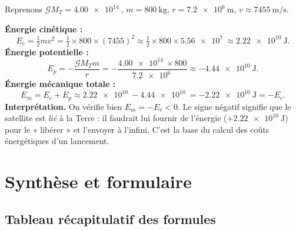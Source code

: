 \documentclass[11pt,a4paper]{article}
\newcommand{\Grav}{\mathcal{G}}        %
\begin{document}
\begin{exemple}
Reprenons $\Grav M_T=\SI{4.00e14}{}$, $m=\SI{800}{\kilogram}$, $r=\SI{7.2e6}{\metre}$,
$v\approx\SI{7455}{\metre\per\second}$.

\smallskip
\textbf{Énergie cinétique :}
\[
E_c=\tfrac12 m v^2=\tfrac12\times 800\times(7455)^2
   \approx\tfrac12\times 800\times\SI{5.56e7}{}\approx\SI{2.22e10}{\joule}.
\]
\textbf{Énergie potentielle :}
\[
E_p=-\frac{\Grav M_T m}{r}=-\frac{\SI{4.00e14}{}\times 800}{\SI{7.2e6}{}}
   \approx -\SI{4.44e10}{\joule}.
\]
\textbf{Énergie mécanique totale :}
\[
E_m=E_c+E_p\approx \SI{2.22e10}{}-\SI{4.44e10}{}=-\SI{2.22e10}{\joule}=-E_c .
\]
\textbf{Interprétation.} On vérifie bien $E_m=-E_c<0$. Le signe négatif signifie que le
satellite est \emph{lié} à la Terre : il faudrait lui fournir de l'énergie
($+\SI{2.22e10}{\joule}$) pour le « libérer » et l'envoyer à l'infini. C'est la base du
calcul des coûts énergétiques d'un lancement.
\end{exemple}

\section{Synthèse et formulaire}

\subsection{Tableau récapitulatif des formules}
\end{document}
